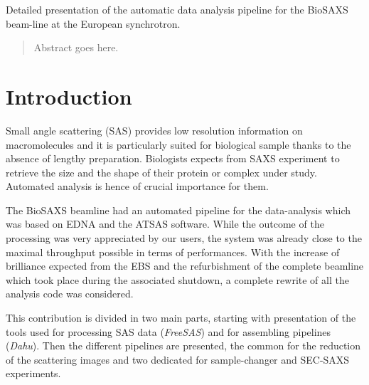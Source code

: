 \documentclass[preprint]{iucr}              %
\begin{document}
\begin{synopsis}
Detailed presentation of the automatic data analysis pipeline for the BioSAXS beam-line at the European synchrotron.  
\end{synopsis}

\begin{abstract}
Abstract goes here.
\end{abstract}



\section{Introduction}
Small angle scattering (SAS) provides low resolution information on macromolecules and it is  
particularly suited for biological sample thanks to the absence of lengthy preparation. 
Biologists expects from SAXS experiment to retrieve the size and the shape of their protein or complex under study.
Automated analysis is hence of crucial importance for them.

The BioSAXS\cite{BM29paper} beamline had an automated pipeline for the data-analysis which was based on EDNA\cite{EDNA} and the ATSAS\cite{ATSAS}
software. 
While the outcome of the processing was very appreciated by our users, the system was already close to the maximal throughput possible in terms of performances. 
With the increase of brilliance expected from the EBS\cite{EBS} and the refurbishment of the complete beamline which took place during the associated shutdown, 
a complete rewrite of all the analysis code was considered.

This contribution is divided in two main parts, starting with presentation of the tools used for 
processing SAS data (\textit{FreeSAS}) and for assembling pipelines (\textit{Dahu}).
Then the different pipelines are presented, the common for the reduction of the scattering images and two dedicated for sample-changer and SEC-SAXS experiments.      
\end{document}
